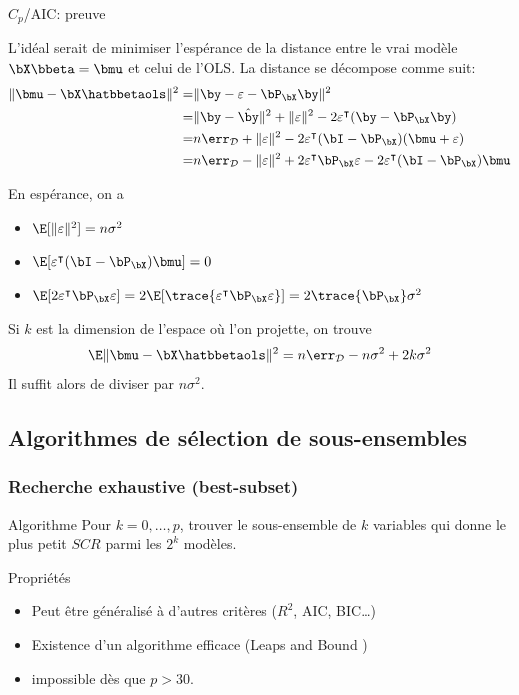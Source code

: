 \documentclass{beamer}\usepackage[]{graphicx}\usepackage[]{color}
\begin{document}
\begin{frame}{$C_p$/AIC: preuve}


  L'idéal  serait de  minimiser  l'espérance de  la
  distance  entre le  vrai  modèle $\bX  \bbeta =  \bmu$  et celui  de
  l'OLS. La distance se décompose comme suit:
\begin{align*}
\| \bmu - \bX \hatbbetaols \|^2 = & \| \by - \varepsilon - \bP_\bX \by \|^2 \\
 =& \| \by -  \hat\by \|^2 + \| \varepsilon \|^2  -2 \varepsilon^\intercal (\by -\bP_\bX\by) \\
  = & n \err_{\mathcal{D}}  + \| \varepsilon  \|^2 -2 \varepsilon^\intercal  (\bI -\bP_\bX) (\bmu + \varepsilon)\\
  = & n\err_{\mathcal{D}} - \| \varepsilon \|^2 +2 \varepsilon^\intercal \bP_\bX \varepsilon -2
\varepsilon^\intercal (\bI -\bP_\bX) \bmu
\end{align*}

En espérance, on a
\begin{itemize}
\item $\E[\| \varepsilon \|^2] = n \sigma^2$
\item $\E[\varepsilon^\intercal (\bI-\bP_\bX)\bmu]=0$
\item $\E[2 \varepsilon^\intercal \bP_\bX \varepsilon]= 2 \E[ \trace{\varepsilon^\intercal \bP_\bX
  \varepsilon}]=2 \trace{\bP_\bX}\sigma^2$
\end{itemize}

Si $k$ est la dimension de l'espace où l'on projette, on trouve
$$
\E \| \bmu - \bX \hatbbetaols \|^2 = n \err_{\mathcal{D}} - n \sigma^2 +2 k \sigma^2
$$
Il suffit alors de diviser par  $n \sigma^2$.
\end{frame}

\subsection{Algorithmes de sélection de sous-ensembles}

\begin{frame}
  \frametitle{Recherche exhaustive (best-subset)}

  \begin{block}{Algorithme}
    Pour $k=0,\dots,p$,  trouver le sous-ensemble de  $k$ variables qui
    donne le plus petit $SCR$ parmi les $2^k$ modèles.
  \end{block}
  
  \vfill
  
  \begin{block}{Propriétés}
    \begin{itemize}
    \item Peut être généralisé à d'autres critères ($R^2$, AIC, BIC\dots)
    \item Existence d'un algorithme efficace (\og Leaps and Bound \fg)
    \item impossible dès que $p>30$.
    \end{itemize}
  \end{block}
\end{frame}
\end{document}
